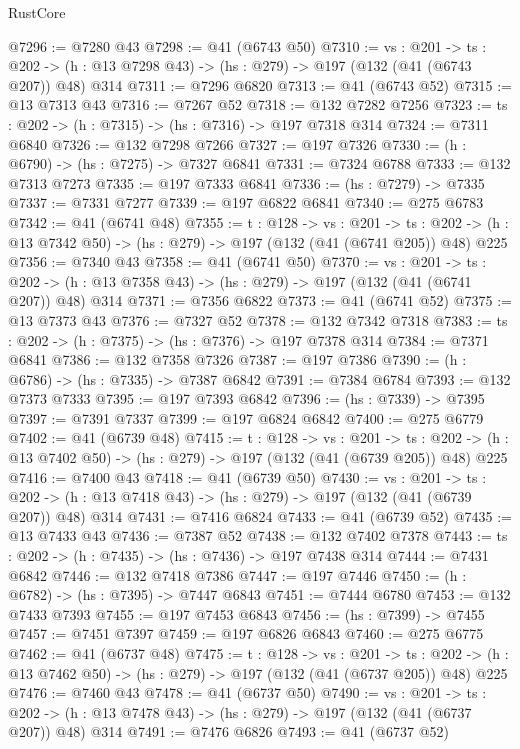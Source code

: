\begin{lexlean}{RustCore}
\begin{coremodule}
@7296 := @7280 @43
@7298 := @41 (@6743 @50)
@7310 := {vs : @201} ->
  {ts : @202} -> (h : @13 @7298 @43) -> (hs : @279) -> @197 (@132 (@41 (@6743 @207)) @48) @314
@7311 := @7296 @6820
@7313 := @41 (@6743 @52)
@7315 := @13 @7313 @43
@7316 := @7267 @52
@7318 := @132 @7282 @7256
@7323 := {ts : @202} -> (h : @7315) -> (hs : @7316) -> @197 @7318 @314
@7324 := @7311 @6840
@7326 := @132 @7298 @7266
@7327 := @197 @7326
@7330 := (h : @6790) -> (hs : @7275) -> @7327 @6841
@7331 := @7324 @6788
@7333 := @132 @7313 @7273
@7335 := @197 @7333 @6841
@7336 := (hs : @7279) -> @7335
@7337 := @7331 @7277
@7339 := @197 @6822 @6841
@7340 := @275 @6783
@7342 := @41 (@6741 @48)
@7355 := {t : @128} ->
  {vs : @201} ->
  {ts : @202} -> (h : @13 @7342 @50) -> (hs : @279) -> @197 (@132 (@41 (@6741 @205)) @48) @225
@7356 := @7340 @43
@7358 := @41 (@6741 @50)
@7370 := {vs : @201} ->
  {ts : @202} -> (h : @13 @7358 @43) -> (hs : @279) -> @197 (@132 (@41 (@6741 @207)) @48) @314
@7371 := @7356 @6822
@7373 := @41 (@6741 @52)
@7375 := @13 @7373 @43
@7376 := @7327 @52
@7378 := @132 @7342 @7318
@7383 := {ts : @202} -> (h : @7375) -> (hs : @7376) -> @197 @7378 @314
@7384 := @7371 @6841
@7386 := @132 @7358 @7326
@7387 := @197 @7386
@7390 := (h : @6786) -> (hs : @7335) -> @7387 @6842
@7391 := @7384 @6784
@7393 := @132 @7373 @7333
@7395 := @197 @7393 @6842
@7396 := (hs : @7339) -> @7395
@7397 := @7391 @7337
@7399 := @197 @6824 @6842
@7400 := @275 @6779
@7402 := @41 (@6739 @48)
@7415 := {t : @128} ->
  {vs : @201} ->
  {ts : @202} -> (h : @13 @7402 @50) -> (hs : @279) -> @197 (@132 (@41 (@6739 @205)) @48) @225
@7416 := @7400 @43
@7418 := @41 (@6739 @50)
@7430 := {vs : @201} ->
  {ts : @202} -> (h : @13 @7418 @43) -> (hs : @279) -> @197 (@132 (@41 (@6739 @207)) @48) @314
@7431 := @7416 @6824
@7433 := @41 (@6739 @52)
@7435 := @13 @7433 @43
@7436 := @7387 @52
@7438 := @132 @7402 @7378
@7443 := {ts : @202} -> (h : @7435) -> (hs : @7436) -> @197 @7438 @314
@7444 := @7431 @6842
@7446 := @132 @7418 @7386
@7447 := @197 @7446
@7450 := (h : @6782) -> (hs : @7395) -> @7447 @6843
@7451 := @7444 @6780
@7453 := @132 @7433 @7393
@7455 := @197 @7453 @6843
@7456 := (hs : @7399) -> @7455
@7457 := @7451 @7397
@7459 := @197 @6826 @6843
@7460 := @275 @6775
@7462 := @41 (@6737 @48)
@7475 := {t : @128} ->
  {vs : @201} ->
  {ts : @202} -> (h : @13 @7462 @50) -> (hs : @279) -> @197 (@132 (@41 (@6737 @205)) @48) @225
@7476 := @7460 @43
@7478 := @41 (@6737 @50)
@7490 := {vs : @201} ->
  {ts : @202} -> (h : @13 @7478 @43) -> (hs : @279) -> @197 (@132 (@41 (@6737 @207)) @48) @314
@7491 := @7476 @6826
@7493 := @41 (@6737 @52)

\end{coremodule}
\end{lexlean}
